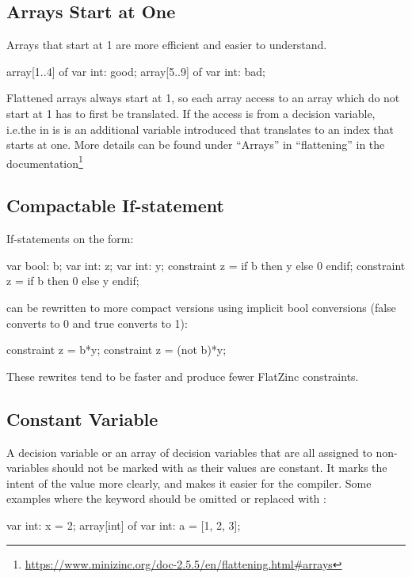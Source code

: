 \documentclass[a4paper,12pt]{article}
\newcommand{\mi}[1]{\mbox{\mzninline{#1}}}
\begin{document}
\subsection{Arrays Start at One}\label{sec:rule:arrayatone}
Arrays that start at 1 are more efficient and easier to understand.
\begin{mznnobreak}
array[1..4] of var int: good;
array[5..9] of var int: bad;
\end{mznnobreak}
Flattened arrays always start at 1, so each array access to an array which do not start at
1 has to first be translated. If the access is from a decision variable, i.e.\@ the \mi{i} in \mi{a[i]} is
\mi{var} is an additional variable introduced that translates \mi{i} to an index that
starts at one. More details can be found under ``Arrays'' in ``flattening'' in the
documentation\footnote{\url{https://www.minizinc.org/doc-2.5.5/en/flattening.html\#arrays}}


\subsection{Compactable If-statement}\label{sec:rule:compactif}
If-statements on the form:

\begin{mznnobreak}
var bool: b; var int: z; var int: y;
constraint z = if b then y else 0 endif;
constraint z = if b then 0 else y endif;
\end{mznnobreak}

can be rewritten to more compact versions using implicit bool conversions (false converts
to 0 and true converts to 1):

\begin{mznnobreak}
constraint z = b*y;
constraint z = (not b)*y;
\end{mznnobreak}

These rewrites tend to be faster and produce fewer FlatZinc constraints.

\subsection{Constant Variable}\label{sec:rule:constvar}
A decision variable or an array of decision variables that are all assigned to non-variables should not be
marked with \mi{var} as their values are constant. It marks the intent of the value more
clearly, and makes it easier for the compiler. Some examples where the keyword \mi{var}
should be omitted or replaced with \mi{par}:

\begin{mznnobreak}
var int: x = 2;
array[int] of var int: a = [1, 2, 3];
\end{mznnobreak}
\end{document}
